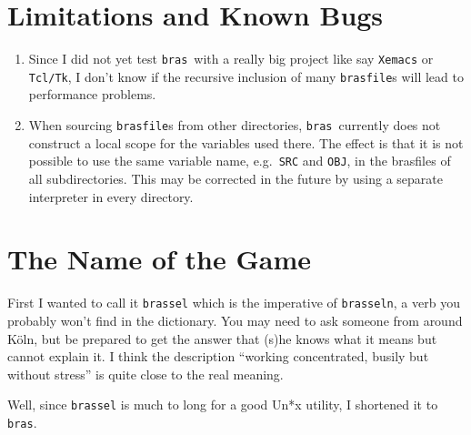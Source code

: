 \documentclass[12pt]{article}
\newcommand{\bras}{\texttt{bras}}
\begin{document}
\section{Limitations and Known Bugs}


\begin{enumerate}
\item
Since I did not yet test \bras\ with a really big project like say
\texttt{Xemacs} or \texttt{Tcl/Tk}, I don't know if the recursive
inclusion of many \texttt{brasfile}s will lead to performance
problems.

\item
When sourcing \texttt{brasfile}s from other directories, \bras\
currently does not construct a local scope for the variables used
there. The effect is that it is not possible to use the same variable
name, e.g.\ \texttt{SRC} and \texttt{OBJ}, in the brasfiles
of all subdirectories. This may be corrected in the future by using a
separate interpreter in every directory.

\end{enumerate}

\section{The Name of the Game}

First I wanted to call it \texttt{brassel} which is the imperative of
\texttt{brasseln}, a verb you probably won't find in the
dictionary. You may need to ask someone from around K\"oln, but be
prepared to get the answer that (s)he knows what it means but cannot
explain it. I think the description "`working concentrated, busily but
without stress"' is quite close to the real meaning.

Well, since \texttt{brassel} is much to long for a good
Un*x utility, I shortened it to \bras.
    
\end{document}
